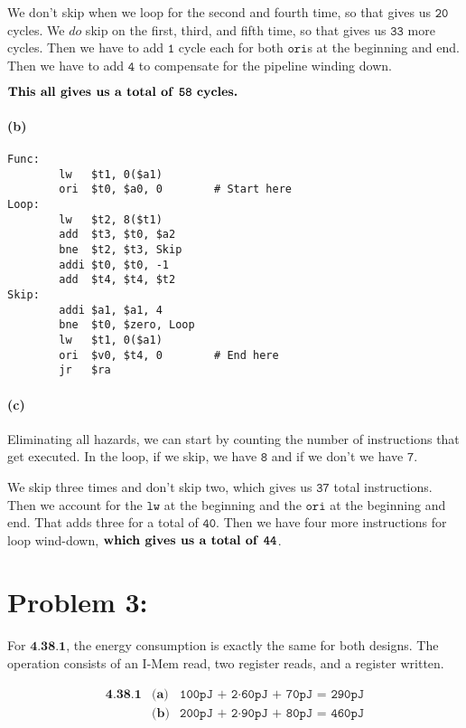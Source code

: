 \documentclass[a4paper]{article}
\begin{document}
We don't skip when we loop for the second and fourth time, so that gives us $\texttt{20}$ cycles. We $\textit{do}$ skip on the first, third, and fifth time, so that gives us $\texttt{33}$ more cycles. Then we have to add $\texttt{1}$ cycle each for both $\texttt{ori}$s at the beginning and end. Then we have to add $\texttt{4}$ to compensate for the pipeline winding down.

$\textbf{This all gives us a total of \texttt{58} cycles.}$

\paragraph{(b)}
\begin{verbatim}
Func:
        lw   $t1, 0($a1)
        ori  $t0, $a0, 0        # Start here
Loop:
        lw   $t2, 8($t1)
        add  $t3, $t0, $a2
        bne  $t2, $t3, Skip
        addi $t0, $t0, -1
        add  $t4, $t4, $t2
Skip:
        addi $a1, $a1, 4
        bne  $t0, $zero, Loop
        lw   $t1, 0($a1)
        ori  $v0, $t4, 0        # End here
        jr   $ra
\end{verbatim}

\paragraph{(c)}

Eliminating all hazards, we can start by counting the number of instructions that get executed. In the loop, if we skip, we have $\texttt{8}$ and if we don't we have $\texttt{7}$.

We skip three times and don't skip two, which gives us $\texttt{37}$ total instructions. Then we account for the $\texttt{lw}$ at the beginning and the $\texttt{ori}$ at the beginning and end. That adds three for a total of $\texttt{40}$. Then we have four more instructions for loop wind-down, $\textbf{which gives us a total of \texttt{44}}$.

\section*{Problem 3:}

For $\textbf{4.38.1}$, the energy consumption is exactly the same for both designs. The operation consists of an I-Mem read, two register reads, and a register written.

\begin{equation}
\begin{array}{rll}
\textbf{4.38.1} & \textbf{(a)} & \texttt{100pJ + 2} \cdot \texttt{60pJ + 70pJ = 290pJ} \\[.05in]
& \textbf{(b)} & \texttt{200pJ + 2} \cdot \texttt{90pJ + 80pJ = 460pJ} \\[.05in]
\end{array}
\end{equation}
\end{document}

